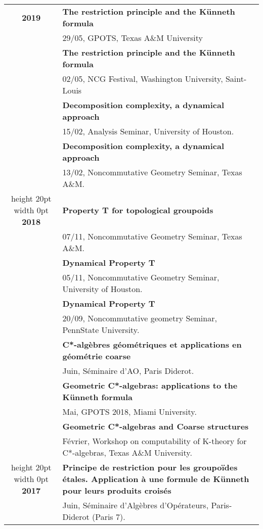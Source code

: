 \documentclass[a4paper,11pt]{article}
\newcommand\espace{\vrule height 20pt width 0pt}
\begin{document}
\begin{tabular}{cp{}}
\textbf{2019} 	& \textbf{The restriction principle and the Künneth formula}\\ %
				& 29/05, GPOTS, Texas A\&M University \\   
				& \textbf{The restriction principle and the Künneth formula}\\	
				& 02/05, NCG Festival, Washington University, Saint-Louis \\ %
				& \textbf{Decomposition complexity, a dynamical approach}\\
				& 15/02, Analysis Seminar, University of Houston. \\ %
				& \textbf{Decomposition complexity, a dynamical approach}\\
				& 13/02, Noncommutative Geometry Seminar, Texas A\&M.  \\ %
				\espace
\textbf{2018} & \textbf{Property T for topological groupoids}\\
				& 07/11, Noncommutative Geometry Seminar, Texas A\&M. \\ %
				& \textbf{Dynamical Property T}\\
				& 05/11, Noncommutative Geometry Seminar, University of Houston. \\ %
				& \textbf{Dynamical Property T}\\
				& 20/09, Noncommutative geometry Seminar, PennState University.\\
				& \textbf{C*-alg\`ebres g\'eom\'etriques et applications en g\'eom\'etrie coarse}\\
				& Juin, S\'eminaire d'AO, Paris Diderot.\\
				& \textbf{Geometric C*-algebras: applications to the K\"unneth formula}\\
				& Mai, GPOTS 2018, Miami University.\\
				& \textbf{Geometric C*-algebras and Coarse structures}\\
				& F\'evrier, Workshop on computability of K-theory for C*-algebras, Texas A\&M University.\\
				\espace	
\textbf{2017} & \textbf{Principe de restriction pour les groupoïdes étales. Application à une formule de Künneth pour leurs produits croisés}\\
				& Juin, Séminaire d'Algèbres d'Opérateurs, Paris-Diderot (Paris 7).\\

\end{tabular}
\end{document}
